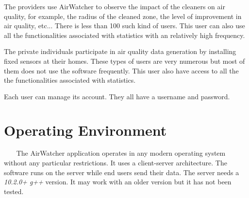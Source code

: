 \documentclass{report}
\begin{document}
The providers use AirWatcher to observe the impact of the cleaners on air
quality, for example, the radius of the cleaned zone, the level of improvement
in air quality, etc... There is less than 100 such kind of users. This user
can also use all the functionalities associated with statistics with an
relatively high frequency.

The private individuals participate in air quality data generation by installing
fixed sensors at their homes. These types of users are very numerous but most of
them does not use the software frequently. This user also have access to all the
the functionalities associated with statistics.

Each user can manage its account. They all have a username and password.




\section{Operating Environment} ~~~
The AirWatcher application operates in any modern operating system without any
particular restrictions. It uses a client-server architecture. The software runs
on the server while end users send their data. The server needs a \textit{10.2.0+
g++} version. It may work with an older version but it has not been tested.

\end{document}
